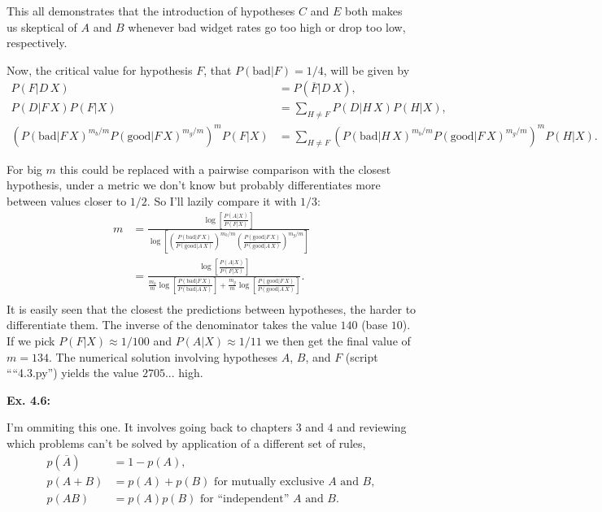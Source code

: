 \documentclass{article}
\begin{document}
This all demonstrates that the introduction of hypotheses $C$ and $E$ both makes us skeptical of $A$ and $B$ whenever bad widget rates go too high or drop too low, respectively.

Now, the critical value for hypothesis $F$, that $P(\text{bad}|F)=1/4$, will be given by
\begin{align*}
	P(F|D\,X)&=P(\overline F|D\,X),\\
	P(D|F\,X)P(F|X)&=\sum_{H\neq F}P(D|H\,X)P(H|X),\\
	\left(P(\text{bad}|F\,X)^{m_b/m}P(\text{good}|F\,X)^{m_g/m}\right)^mP(F|X)&=\sum_{H\neq F}\left(P(\text{bad}|H\,X)^{m_b/m}P(\text{good}|F\,X)^{m_g/m}\right)^mP(H|X).
\end{align*}

For big $m$ this could be replaced with a pairwise comparison with the closest hypothesis, under a metric we don't know but probably differentiates more between values closer to $1/2$. So I'll lazily compare it with $1/3$:
\begin{align*}
	m&=\frac{\log\left[\frac{P(A|X)}{P(F|X)}\right]}{\log\left[\left(\frac{P(\text{bad}|F\,X)}{P(\text{good}|A\,X)}\right)^{m_b/m}\left(\frac{P(\text{good}|F\,X)}{P(\text{good}|A\,X)}\right)^{m_g/m}\right]}\\
	&=\frac{\log\left[\frac{P(A|X)}{P(F|X)}\right]}{\frac{m_b}m\log\left[\frac{P(\text{bad}|F\,X)}{P(\text{bad}|A\,X)}\right]+\frac{m_g}m\log\left[\frac{P(\text{good}|F\,X)}{P(\text{good}|A\,X)}\right]}.\\
\end{align*}
It is easily seen that the closest the predictions between hypotheses, the harder to differentiate them. The inverse of the denominator takes the value $140$ (base $10$). If we pick $P(F|X)\approx1/100$ and $P(A|X)\approx1/11$ we then get the final value of $m=134$. The numerical solution involving hypotheses $A$, $B$, and $F$ (script ````4.3.py'') yields the value $2705$... high.

\textbf{Ex. 4.6: }

I'm ommiting this one. It involves going back to chapters $3$ and $4$ and reviewing which problems can't be solved by application of a different set of rules,
\begin{align*}
	p(\overline{A})&=1-p(A),\\
	p(A+B)&=p(A)+p(B)\text{ for mutually exclusive $A$ and $B$},\\
	p(AB)&=p(A)p(B)\text{ for ``independent'' $A$ and $B$}.
\end{align*}
\end{document}
